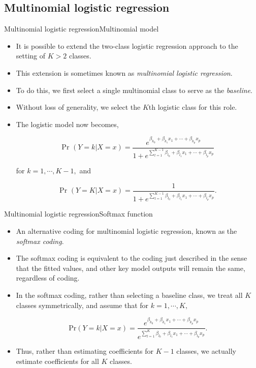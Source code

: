 \subsection{Multinomial logistic regression}
\begin{frame}{Multinomial logistic regression}{Multinomial model}

\begin{itemize}
    \item It is possible to extend the two-class logistic regression approach to the setting of $K > 2$ classes. \pause 
    \item This extension is sometimes known as \textit{multinomial logistic regression}. \pause 
    \item To do this, we first select a single multinomial class to serve as the \textit{baseline}. \pause
    \item Without loss of generality, we select the $K$th logistic class for this role. \pause
    \item The logistic model now becomes, \pause 

    $$ \text{Pr } (Y=k|X=x) = \frac{ e^{ \beta_{k_0} + \beta_{k_1} x_1 + \cdots + \beta_{k_p} x_p }  }{1 + e^{ \sum_{l=1}^{K-1} \beta_{l_0} + \beta_{l_1} x_1 + \cdots + \beta_{l_p} x_p } }  $$

    for $k = 1, \cdots, K-1,$ and

    $$ \text{Pr } (Y=K|X=x) = \frac{ 1  }{1 + e^{ \sum_{l=1}^{K-1} \beta_{l_0} + \beta_{l_1} x_1 + \cdots + \beta_{l_p} x_p } }.$$

    
\end{itemize}

    
\end{frame}

\begin{frame}{Multinomial logistic regression}{Softmax function}

\begin{itemize}
    \item An alternative coding for multinomial logistic regression, known as the \textit{softmax coding}. \pause


    \item The softmax coding is equivalent to the coding just described in the sense that the fitted values, and other key model outputs will remain the same, regardless of coding.  \pause

    \item In the softmax coding, rather than selecting a baseline class, we treat all $K$ classes symmetrically, and assume that for $k = 1, \cdots , K,$ \pause

    
    $$\text{Pr}(Y=k|X=x) =  \frac{ e^{ \beta_{k_0} + \beta_{k_1} x_1 + \cdots + \beta_{k_p} x_p }  }{e^{ \sum_{l=1}^{K} \beta_{l_0} + \beta_{l_1} x_1 + \cdots + \beta_{l_p} x_p } }.$$ \pause

    \item Thus, rather than estimating coeﬃcients for $K-1$ classes, we actually estimate coeﬃcients for all $K$ classes.

    
\end{itemize}

    
\end{frame}